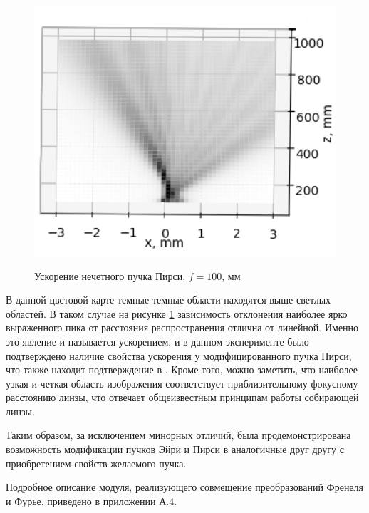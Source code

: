 {	\begin{figure}[H]
	\centering
\includegraphics[height = 10cm]{plots/pe_acc_before_focus.png}
\caption{Ускорение нечетного пучка Пирси, $f = 100$, мм}
	\label{correct_acc_peodd}
\end{figure}

 В данной цветовой карте темные темные области находятся выше светлых областей. В таком случае на рисунке \ref{correct_acc_peodd} зависимость отклонения наиболее ярко выраженного пика от расстояния распространения отлична от линейной. Именно это явление и называется ускорением, и в данном эксперименте было подтверждено наличие свойства ускорения у модифицированного пучка Пирси, что также находит подтверждение в \cite{first_airy}.  Кроме того, можно заметить, что наиболее узкая и четкая область изображения соответствует приблизительному фокусному расстоянию линзы, что отвечает общеизвестным принципам работы собирающей линзы. 
 
 Таким образом, за исключением минорных отличий,  была продемонстрирована возможность модификации пучков Эйри и Пирси в аналогичные друг другу с приобретением свойств желаемого пучка.
 
 Подробное описание модуля, реализующего совмещение преобразований Френеля и Фурье, приведено в приложении А.4.
	
	}
	\newpage
